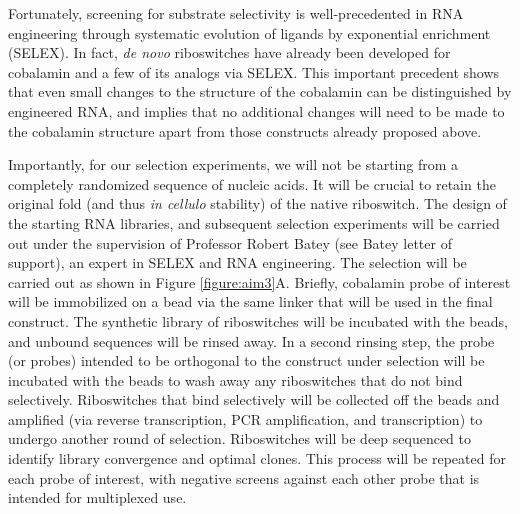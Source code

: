 Fortunately, screening for substrate selectivity is well-precedented in RNA engineering through systematic evolution of ligands by exponential enrichment (SELEX).\cite{MairalAptamersmoleculartools2008,ChoApplicationsAptamersSensors2009} In fact, \textit{de novo} riboswitches have already been developed for cobalamin and a few of its analogs via SELEX.\cite{LorschvitroselectionRNA1994} This important precedent shows that even small changes to the structure of the cobalamin can be distinguished by engineered RNA, and implies that no additional changes will need to be made to the cobalamin structure apart from those constructs already proposed above.

Importantly, for our selection experiments, we will not be starting from a completely randomized sequence of nucleic acids. It will be crucial to retain the original fold (and thus \textit{in cellulo} stability) of the native riboswitch. The design of the starting RNA libraries, and subsequent selection experiments will be carried out under the supervision of Professor Robert Batey (see Batey letter of support), an expert in SELEX and RNA engineering.\cite{TrauschChapterThreeDesign2015} The selection will be carried out as shown in Figure \ref{figure:aim3}A. Briefly, cobalamin probe of interest will be immobilized on a bead via the same linker that will be used in the final construct. The synthetic library of riboswitches will be incubated with the beads, and unbound sequences will be rinsed away. In a second rinsing step, the probe (or probes) intended to be orthogonal to the construct under selection will be incubated with the beads to wash away any riboswitches that do not bind selectively. 
Riboswitches that bind selectively will be collected off the beads and amplified (via reverse transcription, PCR amplification, and transcription) to undergo another round of selection. Riboswitches will be deep sequenced to identify library convergence and optimal clones. This process will be repeated for each probe of interest, with negative screens against each other probe that is intended for multiplexed use.

